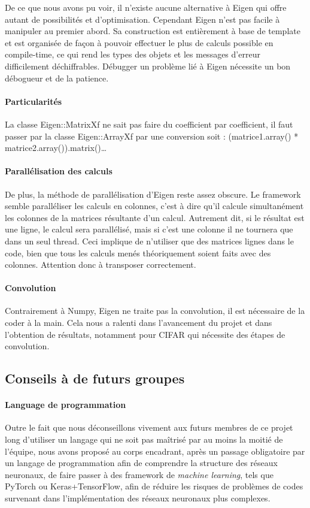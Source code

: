 De ce que nous avons pu voir, il n'existe aucune alternative à Eigen qui offre autant de possibilités et d'optimisation. Cependant Eigen n'est pas facile à manipuler au premier abord. Sa construction est entièrement à base de template et est organisée de façon à pouvoir effectuer le plus de calculs possible en compile-time, ce qui rend les types des objets et les messages d'erreur difficilement déchiffrables. Débugger un problème lié à Eigen nécessite un bon débogueur et de la patience. 

\paragraph{Particularités}
La classe Eigen::MatrixXf ne sait pas faire du coefficient par coefficient, il faut passer par la classe Eigen::ArrayXf par une conversion
soit : (matrice1.array() * matrice2.array()).matrix()…
\paragraph{Parallélisation des calculs}
De plus, la méthode de parallélisation d'Eigen reste assez obscure. Le framework semble paralléliser les calculs en colonnes, c'est à dire qu'il calcule simultanément les colonnes de la matrices résultante d'un calcul. Autrement dit, si le résultat est une ligne, le calcul sera parallélisé, mais si c'est une colonne il ne tournera que dans un seul thread. Ceci implique de n'utiliser que des matrices lignes dans le code, bien que tous les calculs menés théoriquement soient faits avec des colonnes. Attention donc à transposer correctement.
\paragraph{Convolution}
Contrairement à Numpy, Eigen ne traite pas la convolution, il est nécessaire de la coder à la main. Cela nous a ralenti dans l'avancement du projet et dans l'obtention de résultats, notamment pour CIFAR qui nécessite des étapes de convolution.

\subsection{Conseils à de futurs groupes}
\paragraph{Language de programmation}
Outre le fait que nous déconseillons vivement aux futurs membres de ce projet long d'utiliser un langage qui ne soit pas maîtrisé par au moins la moitié de l'équipe, nous avons proposé au corps encadrant, après un passage obligatoire par un langage de programmation afin de comprendre la structure des réseaux neuronaux, de faire passer à des framework de \textit{machine learning}, tels que PyTorch ou Keras+TensorFlow, afin de réduire les risques de problèmes de codes survenant dans l'implémentation des réseaux neuronaux plus complexes.
